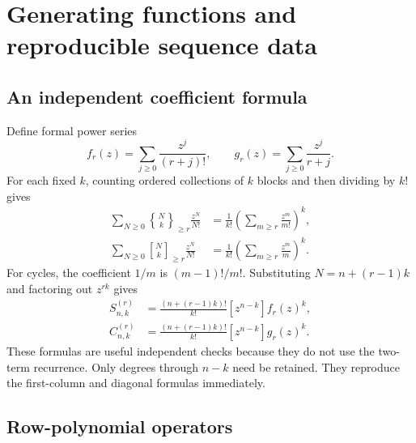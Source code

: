 \documentclass[11pt,a4paper]{article}
\numberwithin{equation}{section}
\theoremstyle{definition}
\theoremstyle{remark}
\newcommand{\Snum}[3]{S^{(#1)}_{#2,#3}}
\newcommand{\Cnum}[3]{C^{(#1)}_{#2,#3}}
\newcommand{\assocS}[3]{\genfrac\{\}{0pt}{}{#1}{#2}_{\!\ge #3}}
\newcommand{\assocC}[3]{\genfrac[]{0pt}{}{#1}{#2}_{\!\ge #3}}
\begin{document}
\section{Generating functions and reproducible sequence data}\label{sec:gf}

\subsection{An independent coefficient formula}

Define formal power series
\begin{equation}\label{eq:fg}
 f_r(z)=\sum_{j\ge0}\frac{z^j}{(r+j)!},\qquad
 g_r(z)=\sum_{j\ge0}\frac{z^j}{r+j}.
\end{equation}
For each fixed $k$, counting ordered collections of $k$ blocks and then
dividing by $k!$ gives
\begin{align}
 \sum_{N\ge0}\assocS Nkr\frac{z^N}{N!}
  &=\frac1{k!}\left(\sum_{m\ge r}\frac{z^m}{m!}\right)^k,
                                                       \label{eq:associated-S-egf}\\
 \sum_{N\ge0}\assocC Nkr\frac{z^N}{N!}
  &=\frac1{k!}\left(\sum_{m\ge r}\frac{z^m}{m}\right)^k.
                                                       \label{eq:associated-C-egf}
\end{align}
For cycles, the coefficient $1/m$ is $(m-1)!/m!$.
Substituting $N=n+(r-1)k$ and factoring out $z^{rk}$ gives
\begin{align}
 \Snum rnk&=\frac{(n+(r-1)k)!}{k!}[z^{n-k}]f_r(z)^k,
                                                       \label{eq:S-coefficient}\\
 \Cnum rnk&=\frac{(n+(r-1)k)!}{k!}[z^{n-k}]g_r(z)^k.
                                                       \label{eq:C-coefficient}
\end{align}
These formulas are useful independent checks because they do not use the
two-term recurrence. Only degrees through $n-k$ need be retained.
They reproduce the first-column and diagonal formulas immediately.

\subsection{Row-polynomial operators}
\end{document}
